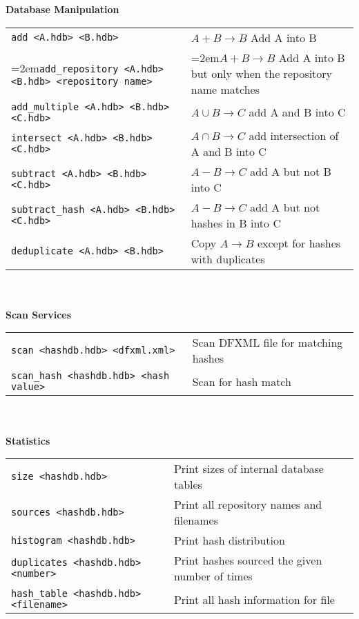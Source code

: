 \documentclass[12pt]{article}
\begin{document}
\textbf{Database Manipulation} \\
\begin{tabular}{p{3.6 in} p{3.4 in}}
\small\texttt{add <A.hdb> <B.hdb>} & $A + B \rightarrow B$ Add A into B \\
\hangindent=2em\small\texttt{add\_repository <A.hdb> <B.hdb> <repository name>} & \hangindent=2em$A + B \rightarrow B$ Add A into B but only when the repository name matches \\
\small\texttt{add\_multiple <A.hdb> <B.hdb> <C.hdb>} & $A \cup B \rightarrow C$ add A and B into C\\
\small\texttt{intersect <A.hdb> <B.hdb> <C.hdb>} & $A \cap B \rightarrow C$ add intersection of A and B into C\\
\small\texttt{subtract <A.hdb> <B.hdb> <C.hdb>} & $A - B \rightarrow C$ add A but not B into C\\
\small\texttt{subtract\_hash <A.hdb> <B.hdb> <C.hdb>} & $A - B \rightarrow C$ add A but not hashes in B into C\\
\small\texttt{deduplicate <A.hdb> <B.hdb>} & Copy $A \rightarrow B$ except for hashes with duplicates \\
\end{tabular}
\\
\\
\textbf{Scan Services} \\
\begin{tabular}{p{3.6 in} p{4 in}}
\small\texttt{scan <hashdb.hdb> <dfxml.xml>} & Scan DFXML file for matching hashes \\
\small\texttt{scan\_hash <hashdb.hdb> <hash value>} & Scan for hash match \\
\end{tabular}
\\
\\
\textbf{Statistics}\\
\begin{tabular}{p{3.6 in} p{4 in}}
\small\small\texttt{size <hashdb.hdb>} & Print sizes of internal database tables \\
\small\texttt{sources <hashdb.hdb>} & Print all repository names and filenames \\
\small\texttt{histogram <hashdb.hdb>} & Print hash distribution \\
\small\texttt{duplicates <hashdb.hdb> <number>} & Print hashes sourced the given number of times \\
\small\texttt{hash\_table <hashdb.hdb> <filename>} & Print all hash information for file\\
\end{tabular}
\end{document}
